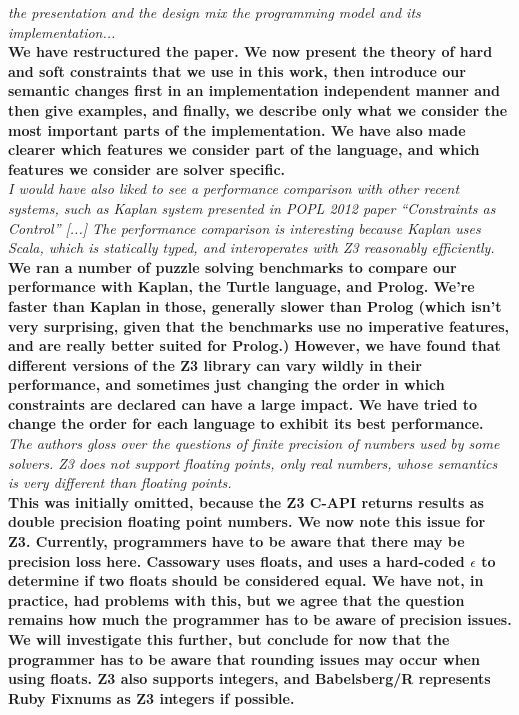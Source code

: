 \documentclass[english]{article}
\begin{document}

\textit{the presentation and the design mix the programming model
  and its implementation...}\\
\textbf{We have restructured the paper. We now present the theory of 
  hard and soft constraints that we use in this work,
  then introduce our semantic changes first in an implementation
  independent manner and then give examples, and finally, we describe
  only what we consider the most important parts of the
  implementation. We have also made clearer which features we consider
  part of the language, and which features we consider are solver
  specific.}\\

\textit{I would have also liked to see a performance comparison with
  other recent systems, such as Kaplan system presented in POPL 2012
  paper ``Constraints as Control'' [...] The performance comparison is
  interesting because Kaplan uses Scala, which is statically typed,
  and interoperates with Z3 reasonably
  efficiently.}\\
\textbf{We ran a number of puzzle solving benchmarks to compare our
  performance with Kaplan, the Turtle language, and Prolog. We're
  faster than Kaplan in those, generally slower than Prolog (which
  isn't very surprising, given that the benchmarks use no imperative
  features, and are really better suited for Prolog.) However, we have
  found that different versions of the Z3 library can vary wildly in
  their performance, and sometimes just changing the order in which
  constraints are declared can have a large impact. We have tried to
  change the order for each language to exhibit its best performance.}\\

\textit{The authors gloss over the questions of finite precision of
  numbers used by some solvers.  Z3 does not support floating points,
  only real numbers, whose semantics is very different than floating
  points.}\\
\textbf{This was initially omitted, because the Z3 C-API returns
  results as double precision floating point numbers. We now note
  this issue for Z3. Currently, programmers have to be aware that
  there may be precision loss here. Cassowary uses floats, and uses a
  hard-coded $\epsilon$ to determine if two floats should be
  considered equal. We have not, in practice, had problems with this,
  but we agree that the question remains how much the programmer has
  to be aware of precision issues. We will investigate this further,
  but conclude for now that the programmer has to be aware that
  rounding issues may occur when using floats. Z3 also supports
  integers, and Babelsberg/R represents Ruby Fixnums as Z3 integers if
  possible.}\\
\end{document}
